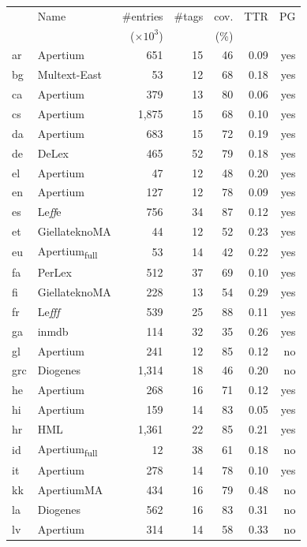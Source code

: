 \documentclass[11pt,letterpaper]{article}
\begin{document}
\begin{table}[t]
\centering
\scriptsize
\begin{tabular}{llrrr|rr}
\toprule
 & Name & \#entries & \#tags  & cov.& TTR & PG \\
 &  & ($\times 10^3$) &   & (\%)&  &  \\
\midrule 
ar &   Apertium & 651 & 15 & 46 &0.09& yes \\
bg & Multext-East & 53 &12 & 68 & 0.18 & yes \\
ca &  Apertium & 379 & 13 & 80 & 0.06 & yes \\
cs &  Apertium & 1,875 & 15 & 68 & 0.10 & yes \\
da & Apertium & 683 & 15 & 72 & 0.19 & yes \\
de & DeLex & 465 & 52 & 79 & 0.18 &yes\\
el & Apertium & 47 & 12 & 48 & 0.20 & yes \\
en & Apertium & 127 & 12 & 78 & 0.09& yes \\
es & Le{\it ff}e &  756 & 34 & 87 & 0.12 &yes\\
et & GiellateknoMA & 44 & 12 & 52 & 0.23 & yes \\
eu & Apertium\textsubscript{full} & 53 &  14 & 42 & 0.22 &  yes \\
fa  & PerLex &  512 & 37 & 69 & 0.10 & yes\\
fi & GiellateknoMA & 228 & 13 & 54 & 0.29 & yes \\
fr & Le{\it fff} & 539 & 25 & 88 &0.11 &yes\\
ga & inmdb & 114 & 32 & 35 & 0.26& yes\\
gl & Apertium & 241 & 12 & 85  & 0.12 &no\\
grc  & Diogenes & 1,314 & 18 & 46 & 0.20 &no\\
he & Apertium & 268 & 16 & 71 & 0.12 & yes\\
hi & Apertium & 159 & 14 & 83 & 0.05 & yes\\
hr  & HML   & 1,361 & 22 & 85 & 0.21 & yes \\
id & Apertium\textsubscript{full}& 12 & 38 &61 &0.18 & no   \\
it & Apertium & 278 &14 & 78 & 0.10 & yes\\
kk & ApertiumMA& 434 & 16 &  79 & 0.48 & no\\
la  & Diogenes & 562 & 16 & 83 & 0.31 &no\\
lv & Apertium & 314 & 14  & 58  & 0.33& no \\

\end{tabular}
\end{table}
\end{document}
